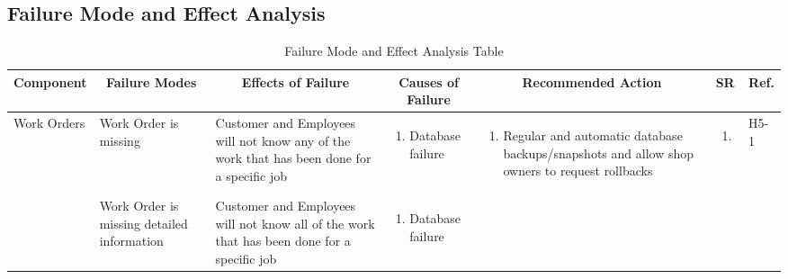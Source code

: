 \documentclass{article}
\begin{document}
\newpage
\begin{landscape}
	\section{Failure Mode and Effect Analysis}
	\begin{table}[H]
		\centering
		\caption{Failure Mode and Effect Analysis Table}
		\begin{adjustbox}{width=\paperwidth}
			\begin{tabular}{|p{0.15\textwidth}|p{}|p{0.25\textwidth}|p{}|p{}|p{}|p{}|}
				\hline
				\multicolumn{1}{|c|}{\textbf{Component}}
				 & \multicolumn{1}{|c|}{\textbf{Failure Modes}}
				 & \multicolumn{1}{|c|}{\textbf{Effects of Failure}}
				 & \multicolumn{1}{|c|}{\textbf{Causes of Failure}}
				 & \multicolumn{1}{|c|}{\textbf{Recommended Action}}
				 & \multicolumn{1}{|c|}{\textbf{SR}}
				 & \multicolumn{1}{|c|}{\textbf{Ref.}}                                                                         \\
				\hline
				\multirow{2}{*}{Work Orders}
				 & Work Order is missing
				 & Customer and Employees will not know any of the work that has been done for a specific job
				 & \begin{enumerate}[label=\alph*., leftmargin=*]
					   \item Database failure
				   \end{enumerate}
				 & \begin{enumerate}[label=\alph*., leftmargin=*]
					   \item Regular and automatic database backups/snapshots and allow shop owners to request rollbacks
				   \end{enumerate}
				 & \begin{enumerate}[label=\alph*., leftmargin=*]
					   \item
				   \end{enumerate}
				 & H5-1                                                                                                        \\
				\cline{2-7}
				~
				 & Work Order is missing detailed information
				 & Customer and Employees will not know all of the work that has been done for a specific job
				 & \begin{enumerate}[label=\alph*., leftmargin=*]
					   \item Database failure
				   \end{enumerate}

\end{tabular}
\end{adjustbox}
\end{table}
\end{landscape}
\end{document}
